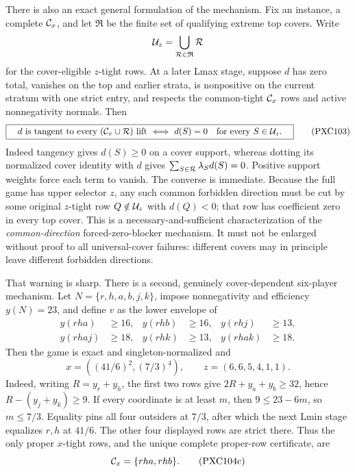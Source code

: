 \documentclass[11pt]{article}
\begin{document}
There is also an exact general formulation of the mechanism.  Fix an
instance, a complete \({\cal C}_x\), and let \(\mathfrak R\) be the finite
set of qualifying extreme top covers.  Write
\[
 {\cal U}_z=\bigcup_{{\cal R}\in\mathfrak R}{\cal R}
\]
for the cover-eligible \(z\)-tight rows.  At a later Lmax stage, suppose
\(d\) has zero total, vanishes on the top and earlier strata, is nonpositive
on the current stratum with one strict entry, and respects the common-tight
\({\cal C}_x\) rows and active nonnegativity normals.  Then
\[
\boxed{\quad
 d\text{ is tangent to every }({\cal C}_x\cup{\cal R})\text{ lift}
 \ \Longleftrightarrow\
 d(S)=0\quad\text{for every }S\in{\cal U}_z .
\quad}                                                       \tag{PXC103}
\]
Indeed tangency gives \(d(S)\ge0\) on a cover support, whereas dotting its
normalized cover identity with \(d\) gives
\(\sum_{S\in{\cal R}}\lambda_Sd(S)=0\).  Positive support weights force
each term to vanish.  The converse is immediate.  Because the full game has
upper selector \(z\), any such common forbidden direction must be cut by
some original \(z\)-tight row \(Q\notin{\cal U}_z\) with \(d(Q)<0\);
that row has coefficient zero in every top cover.  This is a
necessary-and-sufficient characterization of the \emph{common-direction}
forced-zero-blocker mechanism.  It must not be enlarged without proof to
all universal-cover failures: different covers may in principle leave
different forbidden directions.

That warning is sharp.  There is a second, genuinely cover-dependent
six-player mechanism.  Let \(N=\{r,h,a,b,j,k\}\), impose nonnegativity and
efficiency \(y(N)=23\), and define \(v\) as the lower envelope of
\begin{equation}
\begin{aligned}
 y(rha)&\ge16,& y(rhb)&\ge16,& y(rhj)&\ge13,\\
 y(rhaj)&\ge18,& y(rhk)&\ge13,& y(rhak)&\ge18.
\end{aligned}                                                 \tag{PXC104a}
\end{equation}
Then the game is exact and singleton-normalized and
\begin{equation}
 x=\left((41/6)^2,(7/3)^4\right),\qquad
 z=(6,6,5,4,1,1).                                             \tag{PXC104b}
\end{equation}
Indeed, writing \(R=y_r+y_h\), the first two rows give
\(2R+y_a+y_b\ge32\), hence \(R-(y_j+y_k)\ge9\).  If every
coordinate is at least \(m\), then
\(9\le23-6m\), so \(m\le7/3\).  Equality pins all four outsiders
at \(7/3\), after which the next Lmin stage equalizes \(r,h\) at
\(41/6\).  The other four displayed rows are strict there.  Thus the
only proper \(x\)-tight rows, and the unique complete proper-row
certificate, are
\[
             {\cal C}_x=\{rha,rhb\}.                           \tag{PXC104c}
\]
\end{document}
